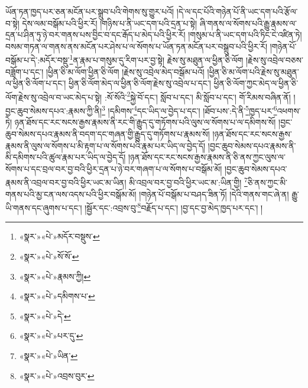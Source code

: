 ཡོན་ཏན་ཁྱད་པར་ཅན་མངོན་པར་སྒྲུབ་པའི་གེགས་སུ་གྱུར་པའོ། །དེ་ལ་དང་པོའི་གཉེན་པོ་ནི་ཡང་དག་པའི་རྩོལ་བ་སྟེ། དེས་ལམ་བསྒོམ་པའི་ཕྱིར་རོ། །གཉིས་པ་ནི་ཡང་དག་པའི་དྲན་པ་སྟེ། ཞི་གནས་ལ་སོགས་པའི་རྒྱུ་རྣམས་ལ་དྲན་པ་ཤིན་ཏུ་ཉེ་བར་གནས་པས་བྱིང་བ་དང་རྒོད་པ་མེད་པའི་ཕྱིར་རོ། །གསུམ་པ་ནི་ཡང་དག་པའི་ཏིང་ངེ་འཛིན་ཏེ། བསམ་གཏན་ལ་གནས་ནས་མངོན་པར་ཤེས་པ་ལ་སོགས་པ་ཡོན་ཏན་མངོན་པར་བསྒྲུབ་པའི་ཕྱིར་རོ། །གཉེན་པོ་བསྒོམ་པ་དེ་:མདོར་བསྡུ་\footnote{«སྣར་»«པེ་»མདོར་བསྡུས་}ན་རྣམ་པ་གསུམ་དུ་རིག་པར་བྱ་སྟེ། རྗེས་སུ་མཐུན་ལ་ཕྱིན་ཅི་ལོག །རྗེས་སུ་འབྲེལ་བཅས་བཟློག་པ་དང་། །ཕྱིན་ཅི་མ་ལོག་ཕྱིན་ཅི་ལོག །རྗེས་སུ་འབྲེལ་མེད་བསྒོམ་པའོ། །ཕྱིན་ཅི་མ་ལོག་པའི་རྗེས་སུ་མཐུན་ལ་ཕྱིན་ཅི་ལོག་པ་དང་། ཕྱིན་ཅི་ལོག་མེད་ལ་ཕྱིན་ཅི་ལོག་རྗེས་སུ་འབྲེལ་པ་དང་། ཕྱིན་ཅི་ལོག་ཀྱང་མེད་ལ་ཕྱིན་ཅི་ལོག་རྗེས་སུ་འབྲེལ་བ་ཡང་མེད་པ་སྟེ། :སོ་སོའི་\footnote{«སྣར་»«པེ་»སོ་སོ་}སྐྱེ་བོ་དང་། སློབ་པ་དང་། མི་སློབ་པ་དང་། གོ་རིམས་བཞིན་ནོ། །བྱང་ཆུབ་སེམས་དཔའ་:རྣམས་ཀྱི་ནི།\footnote{«སྣར་»«པེ་»རྣམས་ཀྱི།} །དམིགས་\footnote{«སྣར་»«པེ་»དམིགས་པ་}དང་ཡིད་ལ་བྱེད་པ་དང་། །ཐོབ་པས་:དེ་ནི་\footnote{«སྣར་»«པེ་»དེ་}ཁྱད་པར་\footnote{«སྣར་»«པེ་»པར་དུ་}འཕགས་ཏེ། ཉན་ཐོས་དང་རང་སངས་རྒྱས་རྣམས་ནི་རང་གི་རྒྱུད་དུ་གཏོགས་པའི་ལུས་ལ་སོགས་པ་ལ་དམིགས་སོ། །བྱང་ཆུབ་སེམས་དཔའ་རྣམས་ནི་བདག་དང་གཞན་གྱི་རྒྱུད་དུ་གཏོགས་པ་རྣམས་སོ། །ཉན་ཐོས་དང་རང་སངས་རྒྱས་རྣམས་ནི་ལུས་ལ་སོགས་པ་མི་རྟག་པ་ལ་སོགས་པའི་རྣམ་པར་ཡིད་ལ་བྱེད་དོ། །བྱང་ཆུབ་སེམས་དཔའ་རྣམས་ནི་མི་དམིགས་པའི་ཚུལ་རྣམ་པར་ཡིད་ལ་བྱེད་དོ། །ཉན་ཐོས་དང་རང་སངས་རྒྱས་རྣམས་ནི་ཅི་ནས་ཀྱང་ལུས་ལ་སོགས་པ་དང་བྲལ་བར་བྱ་བའི་ཕྱིར་དྲན་པ་ཉེ་བར་གཞག་པ་ལ་སོགས་པ་བསྒོམ་མོ། །བྱང་ཆུབ་སེམས་དཔའ་རྣམས་ནི་འབྲལ་བར་བྱ་བའི་ཕྱིར་ཡང་མ་ཡིན། མི་འབྲལ་བར་བྱ་བའི་ཕྱིར་ཡང་མ་:ཡིན་གྱི། \footnote{«སྣར་»«པེ་»ཡིན་}ཅི་ནས་ཀྱང་མི་གནས་པའི་མྱ་ངན་ལས་འདས་པའི་ཕྱིར་བསྒོམ་མོ། །གཉེན་པོ་བསྒོམ་པ་བཤད་ཟིན་ཏོ། །དེའི་གནས་གང་ཞེ་ན། རྒྱུ་ཡི་གནས་དང་ཞུགས་པ་དང་། །སྦྱོར་དང་:འབྲས་བུ་\footnote{«སྣར་»«པེ་»འབྲས་བུར་}བརྗོད་པ་དང་། །བྱ་དང་བྱ་མེད་ཁྱད་པར་དང་། །
